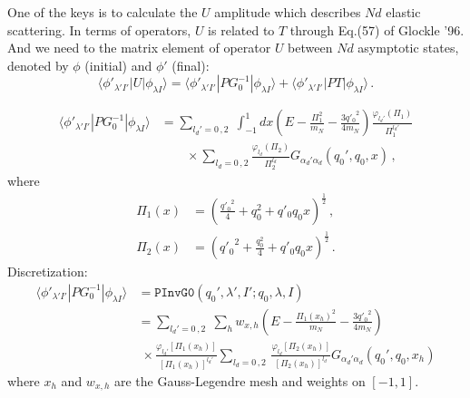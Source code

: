 \documentclass[11pt,aps]{revtex4}
\begin{document}
One of the keys is to calculate the $U$ amplitude which describes $N d$ elastic scattering. In terms of operators, $U$ is related to $T$ through Eq.(57) of Glockle '96. And we need to the matrix element of operator $U$ between $N d$ asymptotic states, denoted by $\phi$ (initial) and $\phi'$ (final):
\begin{equation}
  \langle \phi'_{\lambda' I'} | U | \phi_{\lambda I} \rangle = \langle \phi'_{\lambda' I'} | P G_0^{-1} | \phi_{\lambda I} \rangle + \langle \phi'_{\lambda' I'} | P T | \phi_{\lambda I} \rangle \, .
\end{equation}

\begin{equation}
\begin{split}
  \langle \phi'_{\lambda' I'} | P G_0^{-1} | \phi_{\lambda I} \rangle &= \sum_{l_d' = 0\, , 2} \;  \int_{-1}^{1} dx \left(E - \frac{\Pi_1^2}{m_N} - \frac{3 {q'_0}^2}{4m_N} \right) \frac{\varphi_{l_d'}(\Pi_1)}{\Pi_1^{l_d'}} \\
  & \qquad \times  \sum_{l_d =0\, , 2} \frac{\varphi_{l_d}(\Pi_2)}{\Pi_2^{l_d}} G_{\alpha_d' \alpha_d} (q_0', q_0, x) \, ,
\end{split}
\end{equation}
where
\begin{equation}
\begin{split}
  \Pi_1(x) &= \left(\frac{{q'_0}^2}{4} + q_0^2 + {q'_0} q_0 x \right)^{\frac{1}{2}} \, ,\\
  \Pi_2(x) &= \left({q'_0}^2 + \frac{q_0^2}{4} + {q'_0} q_0 x \right)^{\frac{1}{2}} \, .
\end{split}
\end{equation}
Discretization:
\begin{equation}
\begin{split}
\langle \phi'_{\lambda' I'} | P G_0^{-1} | \phi_{\lambda I} \rangle  &= \texttt{PInvG0}(q_0', \lambda', I'; q_0, \lambda, I) \\
& =  \sum_{l_d' = 0\, , 2} \; \sum_h w_{x,h} \left(E - \frac{\Pi_1(x_h)^2}{m_N} - \frac{3 {q'_0}^2}{4m_N} \right) \\
  & \; \times \frac{\varphi_{l_d'}\left[\Pi_1(x_h)\right]}{[\Pi_1(x_h)]^{l_d'}} \sum_{l_d =0\, , 2} \, \frac{\varphi_{l_d}\left[\Pi_2(x_h)\right]}{[\Pi_2(x_h)]^{l_d}}  G_{\alpha_d' \alpha_d} (q_0', q_0, x_h)
\end{split}
\end{equation}
where $x_h$ and $w_{x, h}$ are the Gauss-Legendre mesh and weights on $[-1, 1]$.
\end{document}
